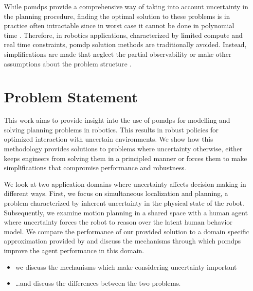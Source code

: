 While \acp{pomdp} provide a comprehensive way of taking into account
uncertainty in the planning procedure, finding the optimal solution to these
problems is in practice often intractable since in worst case it cannot be
done in polynomial time \cite{papadimitriou1987complexity}. Therefore, in
robotics applications, characterized by limited compute and real time
constraints, \ac{pomdp} solution methods are traditionally avoided. Instead,
simplifications are made that neglect the partial observability or make other
assumptions about the problem structure \cite{sadigh2016information,
fisac2018probabilistically}.

\section{Problem Statement}


This work aims to provide insight into the use of \acp{pomdp} for modelling and
solving planning problems in robotics. This results in robust policies for
optimized interaction with uncertain environments. We show how this methodology
provides solutions to problems where uncertainty otherwise, either keeps
engineers from solving them in a principled manner or forces them to make
simplifications that compromise performance and robustness.

We look at two application domains where uncertainty affects decision making in
different ways. First, we focus on simultaneous localization and planning,
a problem characterized by inherent uncertainty in the physical state of the
robot. Subsequently, we examine motion planning in a shared space with a human
agent where uncertainty forces the robot to reason over the latent human
behavior model. We compare the performance of our provided solution to a domain
specific approximation provided by \cite{fisac2018probabilistically} and
discuss the mechanisms through which \acp{pomdp} improve the agent performance
in this domain.

\begin{itemize}
  \item we discuss the mechanisms which make considering uncertainty important
  \item \dots and discuss the differences between the two problems.
\end{itemize}

